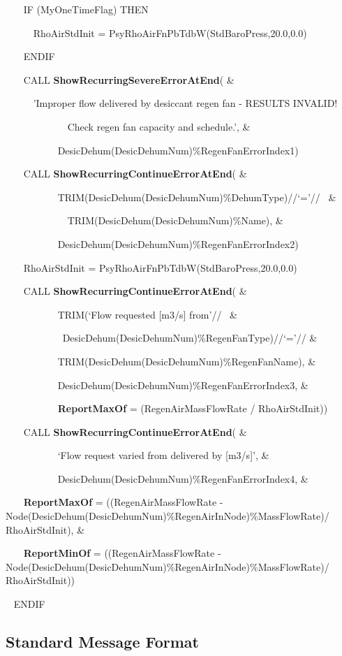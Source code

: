 ~~~ IF (MyOneTimeFlag) THEN

~~~~~ RhoAirStdInit = PsyRhoAirFnPbTdbW(StdBaroPress,20.0,0.0)

~~~ ENDIF

~~~ CALL \textbf{ShowRecurringSevereErrorAtEnd}( \&

~~~~~ 'Improper flow delivered by desiccant regen fan - RESULTS INVALID!

~~~~~~~~~~~~ Check regen fan capacity and schedule.', \&

~~~~~~~~~~ DesicDehum(DesicDehumNum)\%RegenFanErrorIndex1)

~~~ CALL \textbf{ShowRecurringContinueErrorAtEnd}( \&

~~~~~~~~~~ TRIM(DesicDehum(DesicDehumNum)\%DehumType)//`='//~ \&

~~~~~~~~~~~~ TRIM(DesicDehum(DesicDehumNum)\%Name), \&

~~~~~~~~~~ DesicDehum(DesicDehumNum)\%RegenFanErrorIndex2)

~~~ RhoAirStdInit = PsyRhoAirFnPbTdbW(StdBaroPress,20.0,0.0)

~~~ CALL \textbf{ShowRecurringContinueErrorAtEnd}( \&

~~~~~~~~~~ TRIM(`Flow requested {[}m3/s{]} from'//~ \&

~~~~~~~~~~~ DesicDehum(DesicDehumNum)\%RegenFanType)//`='// \&

~~~~~~~~~~ TRIM(DesicDehum(DesicDehumNum)\%RegenFanName), \&

~~~~~~~~~~ DesicDehum(DesicDehumNum)\%RegenFanErrorIndex3, \&

~~~~~~~~~~ \textbf{ReportMaxOf} = (RegenAirMassFlowRate / RhoAirStdInit))

~~~ CALL \textbf{ShowRecurringContinueErrorAtEnd}( \&

~~~~~~~~~~ `Flow request varied from delivered by {[}m3/s{]}', \&

~~~~~~~~~~ DesicDehum(DesicDehumNum)\%RegenFanErrorIndex4, \&

~~~ \textbf{ReportMaxOf} = ((RegenAirMassFlowRate - Node(DesicDehum(DesicDehumNum)\%RegenAirInNode)\%MassFlowRate)/ RhoAirStdInit), \&

~~~ \textbf{ReportMinOf} = ((RegenAirMassFlowRate - Node(DesicDehum(DesicDehumNum)\%RegenAirInNode)\%MassFlowRate)/ RhoAirStdInit))

~ ENDIF

\subsection{Standard Message Format}\label{standard-message-format}

